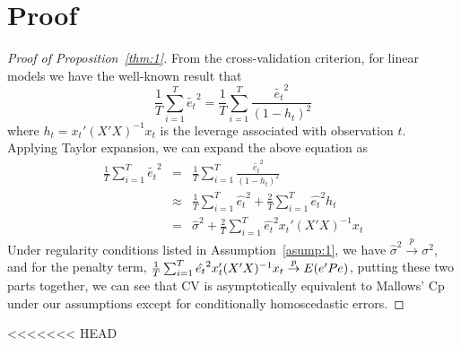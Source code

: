 \appendix
\section{Proof}

\begin{proof}[Proof of Proposition~\ref{thm:1}]
From the cross-validation criterion, for linear models we have the well-known result that
    \begin{equation*}
    \frac{1}{T} \sum_{i=1}^T \tilde{e_t}^2 = \frac{1}{T} \sum_{i=1}^T \frac{\tilde{e_t}^2}{(1-h_t)^2}
    \end{equation*}
where $h_t = x_t'(X'X)^{-1}x_t$ is the leverage associated with observation $t$. Applying Taylor expansion, we can expand the above equation as
    \begin{eqnarray*}
    \frac{1}{T} \sum_{i=1}^T \tilde{e_t}^2 & = & \frac{1}{T} \sum_{i=1}^T \frac{\tilde{e_t}^2}{(1-h_t)^2} \\
                                           & \approx & \frac{1}{T} \sum_{i=1}^T \hat{e_t}^2 + \frac{2}{T} \sum_{i=1}^T \hat{e_t}^2 h_t \\
                                           & = & \hat{\sigma}^2 + \frac{2}{T} \sum_{i=1}^T \hat{e_t}^2 x_t' (X'X)^{-1} x_t
    \end{eqnarray*}
Under regularity conditions listed in Assumption~\ref{asump:1}, we have $\hat{\sigma}^2 \stackrel{p}{\rightarrow} \sigma^{2}$, and for the penalty term,  $\frac{1}{T} \sum_{i=1}^T \hat{e_t}^2 x_t' (X'X)^{-1} x_t \stackrel{p}{\rightarrow} E(\boldmath{e'Pe})$, putting these two parts together, we can see that CV is asymptotically equivalent to Mallows' Cp under our assumptions except for conditionally homoscedastic errors.
\end{proof}
<<<<<<< HEAD

